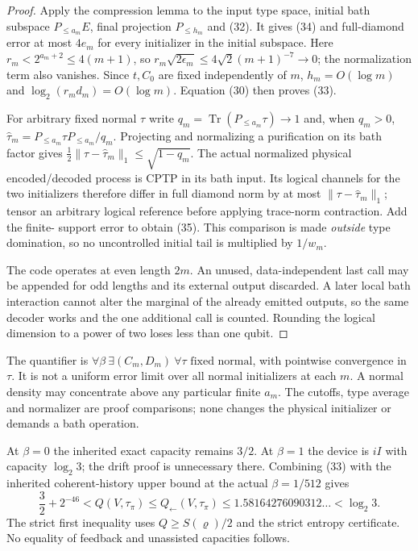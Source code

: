 \documentclass[11pt]{article}
\newcommand{\Tr}{\operatorname{Tr}}
\newcommand{\norm}[1]{\lVert #1\rVert}
\begin{document}
\begin{proof}
Apply the compression lemma to the input type space, initial bath subspace
$P_{\le a_m}E$, final projection $P_{\le h_m}$ and (32). It gives (34) and
full-diamond error at most $4e_m$ for every initializer in the initial subspace.
Here $r_m<2^{a_m+2}\le4(m+1)$, so
$r_m\sqrt{2\epsilon_m}\le4\sqrt2(m+1)^{-7}\to0$; the normalization term also
vanishes. Since $t,C_0$ are fixed independently of $m$, $h_m=O(\log m)$ and
$\log_2(r_md_m)=O(\log m)$. Equation (30) then proves (33).

For arbitrary fixed normal $\tau$ write $q_m=\Tr(P_{\le a_m}\tau)\to1$ and,
when $q_m>0$, $\widehat\tau_m=P_{\le a_m}\tau P_{\le a_m}/q_m$.
Projecting and normalizing a purification on its bath factor gives
$\frac12\norm{\tau-\widehat\tau_m}_1\le\sqrt{1-q_m}$.
The actual normalized physical encoded/decoded process is CPTP in its bath
input. Its logical channels for the two initializers therefore differ in full
diamond norm by at most $\norm{\tau-\widehat\tau_m}_1$; tensor an arbitrary
logical reference before applying trace-norm contraction. Add the finite-
support error to obtain (35). This comparison is made \emph{outside} type
domination, so no uncontrolled initial tail is multiplied by $1/w_m$.

The code operates at even length $2m$. An unused, data-independent last call
may be appended for odd lengths and its external output discarded. A later
local bath interaction cannot alter the marginal of the already emitted
outputs, so the same decoder works and the one additional call is counted.
Rounding the logical dimension to a power of two loses less than one qubit.
\end{proof}

The quantifier is
$\forall\beta\ \exists(C_m,D_m)\ \forall\tau\text{ fixed normal}$,
with pointwise convergence in $\tau$. It is not a uniform error limit over all
normal initializers at each $m$. A normal density may concentrate above any
particular finite $a_m$. The cutoffs, type average and normalizer are proof
comparisons; none changes the physical initializer or demands a bath operation.

At $\beta=0$ the inherited exact capacity remains $3/2$. At $\beta=1$ the
device is $iI$ with capacity $\log_2 3$; the drift proof is unnecessary there.
Combining (33) with the inherited coherent-history upper bound at the actual
$\beta=1/512$ gives
\[
 \boxed{\frac32+2^{-46}<Q(V,\tau_\pi)
 \le Q_{\leftarrow}(V,\tau_\pi)
 \le1.58164276090312\ldots<\log_2 3.}
 \tag{36}
\]
The strict first inequality uses $Q\ge S(\varrho)/2$ and the strict entropy
certificate. No equality of feedback and unassisted capacities follows.
\end{document}
